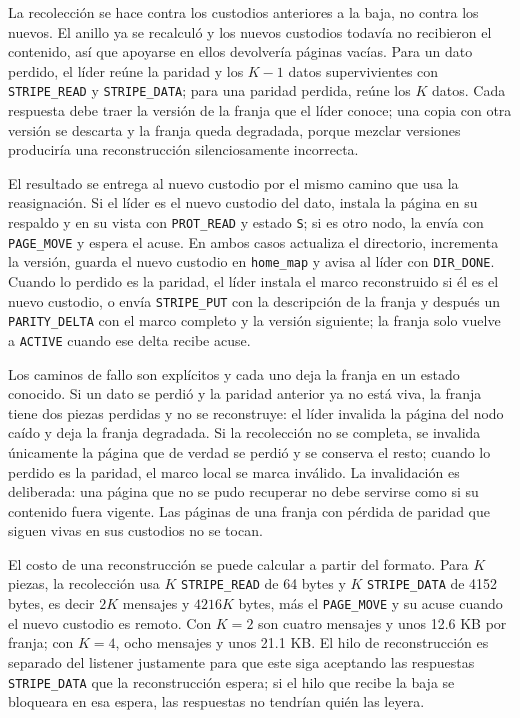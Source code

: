 La recolección se hace contra los custodios anteriores a la baja, no contra los nuevos. El anillo ya se recalculó y los nuevos custodios todavía no recibieron el contenido, así que apoyarse en ellos devolvería páginas vacías. Para un dato perdido, el líder reúne la paridad y los $K-1$ datos supervivientes con \texttt{STRIPE\_READ} y \texttt{STRIPE\_DATA}; para una paridad perdida, reúne los $K$ datos. Cada respuesta debe traer la versión de la franja que el líder conoce; una copia con otra versión se descarta y la franja queda degradada, porque mezclar versiones produciría una reconstrucción silenciosamente incorrecta.

El resultado se entrega al nuevo custodio por el mismo camino que usa la reasignación. Si el líder es el nuevo custodio del dato, instala la página en su respaldo y en su vista con \texttt{PROT\_READ} y estado \texttt{S}; si es otro nodo, la envía con \texttt{PAGE\_MOVE} y espera el acuse. En ambos casos actualiza el directorio, incrementa la versión, guarda el nuevo custodio en \texttt{home\_map} y avisa al líder con \texttt{DIR\_DONE}. Cuando lo perdido es la paridad, el líder instala el marco reconstruido si él es el nuevo custodio, o envía \texttt{STRIPE\_PUT} con la descripción de la franja y después un \texttt{PARITY\_DELTA} con el marco completo y la versión siguiente; la franja solo vuelve a \texttt{ACTIVE} cuando ese delta recibe acuse.

Los caminos de fallo son explícitos y cada uno deja la franja en un estado conocido. Si un dato se perdió y la paridad anterior ya no está viva, la franja tiene dos piezas perdidas y no se reconstruye: el líder invalida la página del nodo caído y deja la franja degradada. Si la recolección no se completa, se invalida únicamente la página que de verdad se perdió y se conserva el resto; cuando lo perdido es la paridad, el marco local se marca inválido. La invalidación es deliberada: una página que no se pudo recuperar no debe servirse como si su contenido fuera vigente. Las páginas de una franja con pérdida de paridad que siguen vivas en sus custodios no se tocan.

El costo de una reconstrucción se puede calcular a partir del formato. Para $K$ piezas, la recolección usa $K$ \texttt{STRIPE\_READ} de 64 bytes y $K$ \texttt{STRIPE\_DATA} de 4152 bytes, es decir $2K$ mensajes y $4216K$ bytes, más el \texttt{PAGE\_MOVE} y su acuse cuando el nuevo custodio es remoto. Con $K=2$ son cuatro mensajes y unos 12.6 KB por franja; con $K=4$, ocho mensajes y unos 21.1 KB. El hilo de reconstrucción es separado del listener justamente para que este siga aceptando las respuestas \texttt{STRIPE\_DATA} que la reconstrucción espera; si el hilo que recibe la baja se bloqueara en esa espera, las respuestas no tendrían quién las leyera.

